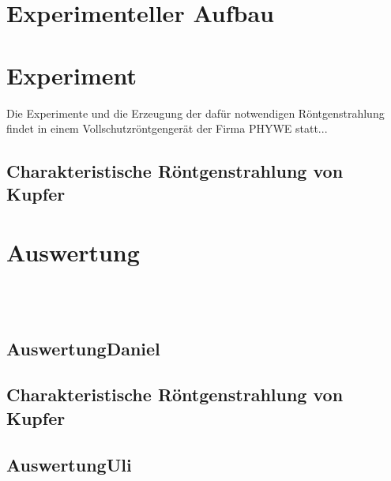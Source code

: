 \documentclass[paper=a4,fontsize=10pt,DIV=18,twocolumn,parskip=half]{scrartcl}
\numberwithin{equation}{section}    %
\begin{document}

%
\section{Experimenteller Aufbau}
%
\section{Experiment}
\label{Experiment}
Die Experimente und die Erzeugung der dafür notwendigen Röntgenstrahlung findet
in einem Vollschutzröntgengerät der Firma PHYWE statt...

\subsection{Charakteristische Röntgenstrahlung von Kupfer}


%
\section{Auswertung}
%



% 
~~~~~~~~~~~~~~~~~~~~~~~~~~~~~~~~~~~~~~~~~~~~~~~~~~~~~~~~~~~~~~~~~~~~~~~~~~~~~
\subsection{AuswertungDaniel}
\label{AuswertungDaniel}
\subsection{Charakteristische Röntgenstrahlung von Kupfer}
\label{01_Auswertung}

\subsection{AuswertungUli}
\label{AuswertungUli}
\end{document}
